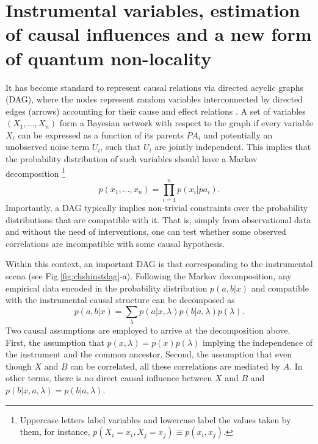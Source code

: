 \documentclass[letterpaper]{article}
\begin{document}
\section*{Instrumental variables, estimation of causal influences and a new form of quantum non-locality}

It has become standard to represent causal relations via directed acyclic graphs
(DAG), where the nodes represent random variables interconnected by directed
edges (arrows) accounting for their cause and effect relations \cite{pearlbook}.
A set of variables  $\left( X_1,\dots, X_n \right)$ form a Bayesian network with
respect to the graph if every variable $X_i$ can be expressed as a function of
its parents $PA_i$ and potentially an unobserved noise term $U_i$, such that
$U_i$ are jointly independent. This implies that the probability distribution of
such variables should have a Markov decomposition \footnote{Uppercase letters
    label variables and lowercase label the values taken by them, for instance,
    $p(X_i =x_i
, X_j = x_j) ≡ p(x_i, x_j)$.}
\begin{equation}
p(x_1,\dots,x_n)= \prod_{i=1}^{n} p(x_i \vert pa_i).    
\end{equation}
Importantly, a DAG typically implies non-trivial constraints over the
probability distributions that are compatible with it. That is, simply from
observational data and without the need of interventions, one can test whether
some observed correlations are incompatible with some causal hypothesis.


Within this context, an important DAG is that corresponding to the instrumental scena (see Fig.\ref{fig:chshinstdag}-a). Following the Markov decomposition, any empirical data encoded in the probability distribution $p(a,b \vert x)$ and compatible with the instrumental causal structure can be decomposed as
\begin{equation}
p(a,b \vert x) = \sum_{\lambda} p(a\vert x,\lambda) p(b\vert a,\lambda)p(\lambda).
\end{equation}
Two causal assumptions are employed to arrive at the decomposition above. First, the assumption that $p(x,\lambda)=p(x)p(\lambda)$ implying the independence of the instrument and the common ancestor. Second, the assumption that even though $X$ and $B$ can be correlated, all these correlations are mediated by $A$. In other terms, there is no direct causal influence between $X$ and $B$ and  $p(b\vert x,a,\lambda)=p(b\vert a,\lambda)$.
\end{document}
